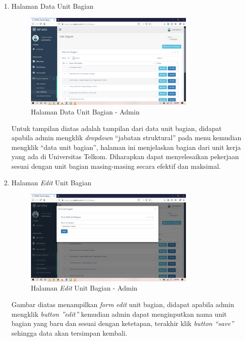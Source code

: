 \begin{enumerate}
	\item Halaman Data Unit Bagian
	\begin{figure}
		\centering
		\includegraphics[width=0.8\textwidth]
		{pics/admin/implementasi/dataunitbagian.png}
		\caption{Halaman Data Unit Bagian - Admin}
		\label{fig:CC10}
	\end{figure}
	Untuk tampilan diatas adalah tampilan dari data unit bagian, didapat apabila admin mengklik \textit{dropdown} “jabatan struktural” pada menu kemudian mengklik “data unit bagian”, halaman ini menjelaskan bagian dari unit kerja yang ada di Universitas Telkom. Diharapkan dapat menyelesaikan pekerjaan sesuai dengan unit bagian masing-masing secara efektif dan maksimal.
	
	\item Halaman \textit{Edit} Unit Bagian
	\begin{figure}
		\centering
		\includegraphics[width=0.8\textwidth]
		{pics/admin/implementasi/editunitbagian.png}
		\caption{Halaman \textit{Edit} Unit Bagian - Admin}
		\label{fig:CC10}
	\end{figure}
	Gambar diatas menampilkan \textit{form edit} unit bagian, didapat apabila admin mengklik \textit{button ”edit”} kemudian admin dapat menginputkan nama unit bagian yang baru dan sesuai dengan ketetapan, terakhir klik \textit{button “save”} sehingga data akan tersimpan kembali.
	

\end{enumerate}
